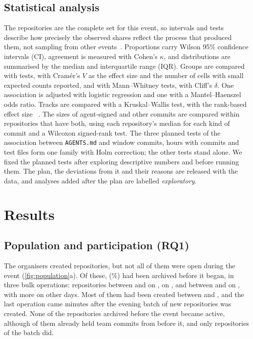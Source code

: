 \documentclass{article}
\begin{document}
\subsection{Statistical analysis}
The repositories are the complete set for this event, so intervals and tests describe how precisely the observed shares reflect the process that produced them, not sampling from other events~\cite{baltes2022sampling}. Proportions carry Wilson 95\% confidence intervals (CI), agreement is measured with Cohen's $\kappa$, and distributions are summarised by the median and interquartile range (IQR). Groups are compared with \chisq{} tests, with Cramér's $V$ as the effect size and the number of cells with small expected counts reported, and with Mann--Whitney tests, with Cliff's $\delta$. One association is adjusted with logistic regression and one with a Mantel--Haenszel odds ratio. Tracks are compared with a Kruskal--Wallis test, with the rank-based effect size \epsqformula{}~\cite{tomczak2014effectsize}. The sizes of agent-signed and other commits are compared within repositories that have both, using each repository's median for each kind of commit and a Wilcoxon signed-rank test. The three planned tests of the association between \texttt{AGENTS.md} and window commits, hours with commits and test files form one family with Holm correction; the other tests stand alone. We fixed the planned tests after exploring descriptive numbers and before running them. The plan, the deviations from it and their reasons are released with the data, and analyses added after the plan are labelled \emph{exploratory}.

\section{Results}\label{sec:results}

\subsection{Population and participation (RQ1)}\label{sec:population}

The organisers created \NRqOneTotal{} repositories, but not all of them were open during the event (\cref{fig:population}a). Of these, \NRqOnePrearchivedN{} (\NRqOnePrearchivedPct\%) had been archived before it began, in three bulk operations: \NRqOnePrearchivedClustersSepOneFiveN{} repositories between \NRqOnePrearchivedClustersSepOneFiveFirst{} and \NRqOnePrearchivedClustersSepOneFiveLast{} on \sepfifteen, \NRqOnePrearchivedClustersSepOneSevenN{} on \sepseventeen{}, and \NRqOnePrearchivedClustersSepTwoTwoN{} between \NRqOnePrearchivedClustersSepTwoTwoFirst{} and \NRqOnePrearchivedClustersSepTwoTwoLast{} on \batchday{}, with \NRqOnePrearchivedOther{} more on other days. Most of them had been created between \sepfifteen{} and \septwentyone{}, and the last operation came minutes after the evening batch of \NRqOneBatchN{} new repositories was created. None of the repositories archived before the event became active, although \NRqOnePrearchivedWithCommits{} of them already held team commits from before it, and only \NRqOneBatchActiveN{} repositories of the batch did.
\end{document}
